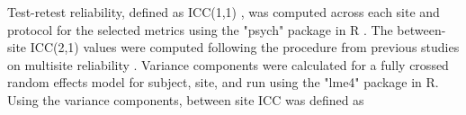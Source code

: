 Test-retest reliability, defined as ICC(1,1) \cite{fmriReliability}, was computed across each site and protocol for the selected metrics using the "psych" package in R \cite{psych}. The between-site ICC(2,1) values were computed following the procedure from previous studies on multisite reliability \cite{fmriReliability,cannon2014}. Variance components were calculated for a fully crossed random effects model for subject, site, and run using the "lme4" package in R. Using the variance components, between site ICC was defined as